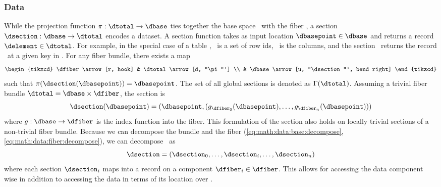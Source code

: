 \documentclass[../main.tex]{subfiles}
\begin{document}
\subsubsection{Data \dsection}
\label{sec:data_section}
While the projection function $\pi:\dtotal \rightarrow\dbase$ ties together the base space \dbase\ with the fiber \dfiber, a section $\dsection: \dbase\rightarrow \dtotal$ encodes a dataset. A section function takes as input location $\dbasepoint \in \dbase$ and returns a record $\delement \in \dtotal$. For example, in the special case of a table \cite{spivakSIMPLICIALDATABASES}, \dbase\ is a set of row ids, \dfiber\ is the columns, and the section \dsection\ returns the record \delement\ at a given key in \dbase. For any fiber bundle, there exists a map
\begin{equation}
    \begin{tikzcd}
        \dfiber \arrow[r, hook] & \dtotal \arrow[d, "\pi"'] \\
                          & \dbase \arrow[u, "\dsection"', bend right]
    \end{tikzcd}
\end{equation}
 such that $\pi(\dsection(\dbasepoint)) = \dbasepoint$. The set of all global sections is denoted as $\Gamma(\dtotal)$. Assuming a trivial fiber bundle $\dtotal = \dbase \times \dfiber$, the section is 
\begin{equation}
    \label{eq:section_return}
    \dsection(\dbasepoint) = (\dbasepoint, (g_{\dfiber_{0}}(\dbasepoint), \ldots, g_{\dfiber_{n}}(\dbasepoint)))
\end{equation}
where $g: \dbase \rightarrow \dfiber$ is the index function into the fiber. This formulation of the section also holds on locally trivial sections of a non-trivial fiber bundle. Because we can decompose the bundle and the fiber (\autoref{eq:math:data:base:decompose}, \autoref{eq:math:data:fiber:decompose}), we can decompose \dsection\ as 
\begin{equation}
\label{eq:math:data:section:decompose}
\dsection= (\dsection_0,\ldots, \dsection_i, \dots, \dsection_n) 
\end{equation}
where each section $\dsection_i$ maps into a record on a component $\dfiber_i \in \dfiber$. This allows for accessing the data component wise in addition to accessing the data in terms of its location over \dbase.
\end{document}
